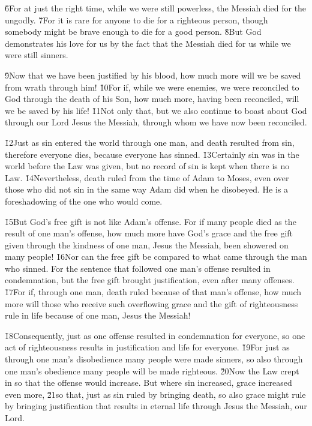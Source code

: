 \v{6}For at just the right time, while we were still powerless, the Messiah died for the ungodly. \v{7}For it is rare for anyone to die for a righteous person, though somebody might be brave enough to die for a good person. \v{8}But God demonstrates his love for us by the fact that the Messiah died for us while we were still sinners.

\v{9}Now that we have been justified by his blood, how much more will we be saved from wrath through him! \v{10}For if, while we were enemies, we were reconciled to God through the death of his Son, how much more, having been reconciled, will we be saved by his life! \v{11}Not only that, but we also continue to boast about God through our Lord Jesus the Messiah, through whom we have now been reconciled.

\v{12}Just as sin entered the world through one man, and death resulted from sin, therefore everyone dies, because everyone has sinned. \v{13}Certainly sin was in the world before the Law was given, but no record of sin is kept when there is no Law. \v{14}Nevertheless, death ruled from the time of Adam to Moses, even over those who did not sin in the same way Adam did when he disobeyed. He is a foreshadowing of the one who would come.

\v{15}But God's free gift is not like Adam's offense. For if many people died as the result of one man's offense, how much more have God's grace and the free gift given through the kindness of one man, Jesus the Messiah, been showered on many people! \v{16}Nor can the free gift be compared to what came through the man who sinned. For the sentence that followed one man's offense resulted in condemnation, but the free gift brought justification, even after many offenses. \v{17}For if, through one man, death ruled because of that man's offense, how much more will those who receive such overflowing grace and the gift of righteousness rule in life because of one man, Jesus the Messiah!

\v{18}Consequently, just as one offense resulted in condemnation for everyone, so one act of righteousness results in justification and life for everyone. \v{19}For just as through one man's disobedience many people were made sinners, so also through one man's obedience many people will be made righteous. \v{20}Now the Law crept in so that the offense would increase. But where sin increased, grace increased even more, \v{21}so that, just as sin ruled by bringing death, so also grace might rule by bringing justification that results in eternal life through Jesus the Messiah, our Lord.


